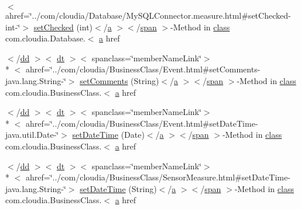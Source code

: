 \begin{DoxyCompactItemize}
$<$ ahref=\char`\"{}../com/cloudia/Database/My\-S\-Q\-L\-Connector.\-measure.\-html\#set\-Checked-\/int-\/\char`\"{}$>$ \hyperlink{index-17_8html_a75c6c203308e696a7363f2ad785c7885}{set\-Checked} (int)$<$/\hyperlink{style_8css_a5e8981582017bb8b84c21f148345d1f7}{a} $>$$<$/\hyperlink{stylesheet_8css_a8343996ebcf16220b04e54659aac31cc}{span} $>$-\/Method in \hyperlink{_tools_8html_acf06f836132665ba8114f5a414c2403f}{class} com.\-cloudia.\-Database.$<$ \hyperlink{style_8css_a5e8981582017bb8b84c21f148345d1f7}{a} href
\item 
$<$/\hyperlink{stylesheet_8css_a47f4718a86835a7771ec592ece845221}{dd} $>$$<$ \hyperlink{stylesheet_8css_a107565fb4039d33b041380d6e0ea1d80}{dt} $>$$<$ spanclass=\char`\"{}member\-Name\-Link\char`\"{}$>$\\*
$<$ ahref=\char`\"{}../com/cloudia/Business\-Class/Event.\-html\#set\-Comments-\/java.\-lang.\-String-\/\char`\"{}$>$ \hyperlink{index-17_8html_afb17438175a12e8cde4b037101977637}{set\-Comments} (String)$<$/\hyperlink{style_8css_a5e8981582017bb8b84c21f148345d1f7}{a} $>$$<$/\hyperlink{stylesheet_8css_a8343996ebcf16220b04e54659aac31cc}{span} $>$-\/Method in \hyperlink{_tools_8html_acf06f836132665ba8114f5a414c2403f}{class} com.\-cloudia.\-Business\-Class.$<$ \hyperlink{style_8css_a5e8981582017bb8b84c21f148345d1f7}{a} href
\item 
$<$/\hyperlink{stylesheet_8css_a47f4718a86835a7771ec592ece845221}{dd} $>$$<$ \hyperlink{stylesheet_8css_a107565fb4039d33b041380d6e0ea1d80}{dt} $>$$<$ spanclass=\char`\"{}member\-Name\-Link\char`\"{}$>$\\*
$<$ ahref=\char`\"{}../com/cloudia/Business\-Class/Event.\-html\#set\-Date\-Time-\/java.\-util.\-Date-\/\char`\"{}$>$ \hyperlink{index-17_8html_aec156c5e03134175c4afef865833ac5f}{set\-Date\-Time} (Date)$<$/\hyperlink{style_8css_a5e8981582017bb8b84c21f148345d1f7}{a} $>$$<$/\hyperlink{stylesheet_8css_a8343996ebcf16220b04e54659aac31cc}{span} $>$-\/Method in \hyperlink{_tools_8html_acf06f836132665ba8114f5a414c2403f}{class} com.\-cloudia.\-Business\-Class.$<$ \hyperlink{style_8css_a5e8981582017bb8b84c21f148345d1f7}{a} href
\item 
$<$/\hyperlink{stylesheet_8css_a47f4718a86835a7771ec592ece845221}{dd} $>$$<$ \hyperlink{stylesheet_8css_a107565fb4039d33b041380d6e0ea1d80}{dt} $>$$<$ spanclass=\char`\"{}member\-Name\-Link\char`\"{}$>$\\*
$<$ ahref=\char`\"{}../com/cloudia/Business\-Class/Sensor\-Measure.\-html\#set\-Date\-Time-\/java.\-lang.\-String-\/\char`\"{}$>$ \hyperlink{index-17_8html_a1e1d5d45f0becdabaada093632ca0cbf}{set\-Date\-Time} (String)$<$/\hyperlink{style_8css_a5e8981582017bb8b84c21f148345d1f7}{a} $>$$<$/\hyperlink{stylesheet_8css_a8343996ebcf16220b04e54659aac31cc}{span} $>$-\/Method in \hyperlink{_tools_8html_acf06f836132665ba8114f5a414c2403f}{class} com.\-cloudia.\-Business\-Class.$<$ \hyperlink{style_8css_a5e8981582017bb8b84c21f148345d1f7}{a} href

\end{DoxyCompactItemize}
